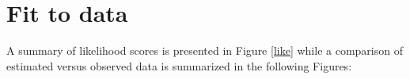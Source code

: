 \documentclass[review]{elsarticle}
\begin{document}
%
%



\section{Fit to data}

A summary of likelihood scores is presented in Figure \ref{like} while a comparison of estimated versus observed data is summarized in the following Figures:
\end{document}
